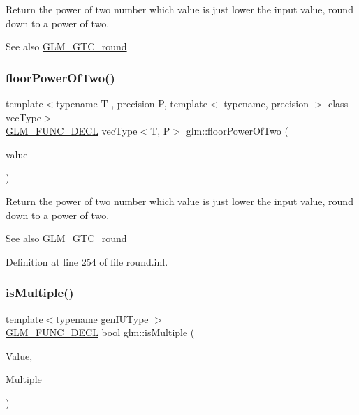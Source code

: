 Return the power of two number which value is just lower the input value, round down to a power of two.

\begin{DoxySeeAlso}{See also}
\mbox{\hyperlink{group__gtc__round}{G\+L\+M\+\_\+\+G\+T\+C\+\_\+round}} 
\end{DoxySeeAlso}
\mbox{\label{group__gtc__round_ga6a5a8f6dd1b2f755e4572bd039062c37}} 
\subsubsection{\texorpdfstring{floorPowerOfTwo()}{floorPowerOfTwo()}\hspace{0.1cm}{\footnotesize\ttfamily [2/2]}}
{\footnotesize\ttfamily template$<$typename T , precision P, template$<$ typename, precision $>$ class vec\+Type$>$ \\
\mbox{\hyperlink{setup_8hpp_ab2d052de21a70539923e9bcbf6e83a51}{G\+L\+M\+\_\+\+F\+U\+N\+C\+\_\+\+D\+E\+CL}} vec\+Type$<$T, P$>$ glm\+::floor\+Power\+Of\+Two (\begin{DoxyParamCaption}\item[{vec\+Type$<$ T, P $>$ const \&}]{value }\end{DoxyParamCaption})}

Return the power of two number which value is just lower the input value, round down to a power of two.

\begin{DoxySeeAlso}{See also}
\mbox{\hyperlink{group__gtc__round}{G\+L\+M\+\_\+\+G\+T\+C\+\_\+round}} 
\end{DoxySeeAlso}


Definition at line 254 of file round.\+inl.

\mbox{\label{group__gtc__round_gaf7444a7b2eb524f373463ceba76b9326}} 
\subsubsection{\texorpdfstring{isMultiple()}{isMultiple()}\hspace{0.1cm}{\footnotesize\ttfamily [1/3]}}
{\footnotesize\ttfamily template$<$typename gen\+I\+U\+Type $>$ \\
\mbox{\hyperlink{setup_8hpp_ab2d052de21a70539923e9bcbf6e83a51}{G\+L\+M\+\_\+\+F\+U\+N\+C\+\_\+\+D\+E\+CL}} bool glm\+::is\+Multiple (\begin{DoxyParamCaption}\item[{gen\+I\+U\+Type}]{Value,  }\item[{gen\+I\+U\+Type}]{Multiple }\end{DoxyParamCaption})}

